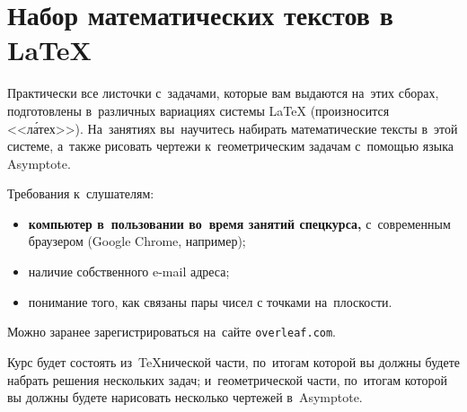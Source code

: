 \section*{Набор математических текстов в {\LaTeX}}

Практически все листочки с~задачами, которые вам выдаются на~этих сборах,
подготовлены в~различных вариациях системы {\LaTeX}
(произносится <<л\'{а}тех>>).
На~занятиях вы~научитесь набирать математические тексты в~этой системе,
а~также рисовать чертежи к~геометрическим задачам с~помощью языка Asymptote.

Требования к~слушателям:
\begin{itemize}
\item
\textbf{компьютер в~пользовании во~время занятий спецкурса,}
с~современным браузером (Google Chrome, например);
\item
наличие собственного e-mail адреса;
\item
понимание того, как связаны пары чисел с точками на~плоскости.
\end{itemize}

Можно заранее зарегистрироваться на~сайте \texttt{overleaf.com}.

Курс будет состоять из~\TeX нической части, по~итогам которой вы должны будете
набрать решения нескольких задач;
и~геометрической части, по~итогам которой вы должны будете нарисовать несколько
чертежей в~Asymptote.


